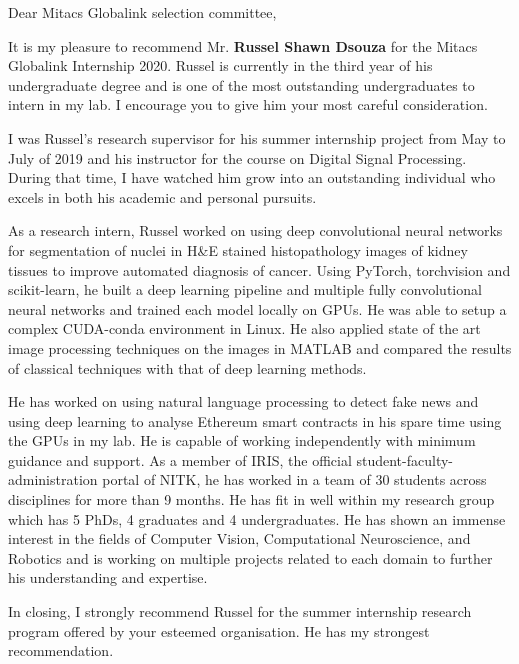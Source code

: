 \documentclass[12pt]{article}
\begin{document}
  \noindent
  Dear Mitacs Globalink selection committee,

  \bigskip
  \noindent
  It is my pleasure to recommend Mr. \textbf{Russel Shawn Dsouza} for the Mitacs Globalink Internship 2020. Russel is currently in the third year of his undergraduate degree and is one of the most outstanding undergraduates to intern in my lab. I encourage you to give him your most careful consideration.

  \medskip
  \noindent
  I was Russel's research supervisor for his summer internship project from May to July of 2019 and his instructor for the course on Digital Signal Processing.
  During that time, I have watched him grow into an outstanding individual who excels in both his academic and personal pursuits.

  \medskip
  \noindent
  As a research intern, Russel worked on using deep convolutional neural networks for segmentation of nuclei in H\&E stained histopathology images of kidney tissues to improve automated diagnosis of cancer.
  Using PyTorch, torchvision and scikit-learn, he built a deep learning pipeline and multiple fully convolutional neural networks and trained each model locally on GPUs. 
  He was able to setup a complex CUDA-conda environment in Linux.
  He also applied state of the art image processing techniques on the images in MATLAB and compared the results of classical techniques with that of deep learning methods.

  \medskip
  \noindent
  He has worked on using natural language processing to detect fake news and using deep learning to analyse Ethereum smart contracts in his spare time using the GPUs in my lab.
  He is capable of working independently with minimum guidance and support. 
  As a member of IRIS, the official student-faculty-administration portal of NITK, he has worked in a team of 30 students across disciplines for more than 9 months.
  He has fit in well within my research group which has 5 PhDs, 4 graduates and 4 undergraduates.
  He has shown an immense interest in the fields of Computer Vision, Computational Neuroscience, and Robotics and is working on multiple projects related to each domain to further his understanding and expertise.

  \medskip
  \noindent
  In closing, I strongly recommend Russel for the summer internship research program offered by your esteemed organisation. He has my strongest recommendation.
\end{document}
